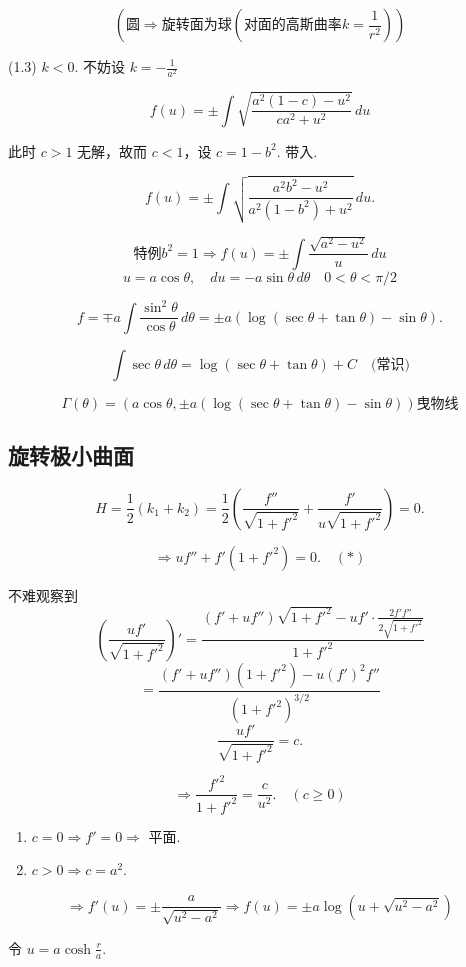 \documentclass[lang=cn,10pt,thmcnt=section]{elegantbook}
\begin{document}
\[
(\text{圆} \Rightarrow \text{旋转面为球} (\text{对面的高斯曲率} k = \frac{1}{r^2}))
\]

(1.3) $k < 0$. 不妨设 $k = -\frac{1}{a^2}$

\[
f(u) = \pm \int \sqrt{\frac{a^2(1 - c) - u^2}{ca^2 + u^2}} \, du
\]

此时 $c > 1$ 无解，故而 $c < 1$，设 $c = 1 - b^2$. 带入.

\[
f(u) = \pm \int \sqrt{\frac{a^2b^2 - u^2}{a^2(1 - b^2) + u^2}} \, du.
\]

\[
\text{特例} b^2 = 1 \Rightarrow f(u) = \pm \int \frac{\sqrt{a^2 - u^2}}{u} \, du
\]
\[
u = a \cos \theta, \quad du = -a \sin \theta \, d\theta \quad 0 < \theta < \pi/2
\]

\[
f = \mp a \int \frac{\sin^2 \theta}{\cos \theta} \, d\theta = \pm a (\log (\sec \theta + \tan \theta) - \sin \theta).
\]

\[
\int \sec \theta \, d\theta = \log (\sec \theta + \tan \theta) + C \quad \text{(常识)}
\]

\[
\Gamma(\theta) = (a \cos \theta, \pm a (\log (\sec \theta + \tan \theta) - \sin \theta))\text{曳物线}
\]

\subsection{旋转极小曲面}
\[
H = \frac{1}{2}(k_1 + k_2) = \frac{1}{2} \left( \frac{f''}{\sqrt{1 + f'^2}} + \frac{f'}{u \sqrt{1 + f'^2}} \right) = 0.
\]

\[
\Rightarrow u f'' + f'(1 + f'^2) = 0. \quad (*)
\]

不难观察到
\[
\left( \frac{u f'}{\sqrt{1 + f'^2}} \right)' = \frac{(f' + u f'') \sqrt{1 + f'^2} - u f' \cdot \frac{2 f' f''}{2 \sqrt{1 + f'^2}}}{1 + f'^2}
\]
\[
= \frac{(f' + u f'')(1 + f'^2) - u (f')^2 f''}{(1 + f'^2)^{3/2}}
\]
\[
\frac{u f'}{\sqrt{1 + f'^2}} = c.
\]

\[
\Rightarrow \frac{f'^2}{1 + f'^2} = \frac{c}{u^2}. \quad (c \geq 0)
\]

\begin{enumerate}
    \item $c = 0 \Rightarrow f' = 0 \Rightarrow$ 平面.
    \item $c > 0 \Rightarrow c = a^2$.
\end{enumerate}

\[
\Rightarrow f'(u) = \pm \frac{a}{\sqrt{u^2 - a^2}} \Rightarrow f(u) = \pm a \log(u + \sqrt{u^2 - a^2})
\]

令 $u = a \cosh \frac{r}{a}$.
\end{document}
